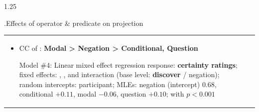 \documentclass[final, table, cmyk]{beamer}
\newlength{\colwidth}
\newlength{\mboxpreadjust}
\begin{document}
\begin{frame}[t]
\begin{columns}[t]
\begin{column}{1.25\colwidth}
\begin{normalbox}{\phantom.\hfill Effects of operator \& predicate on projection}
\begin{tabular}{p{.70\linewidth} p{.3\linewidth}}
\begin{itemize}
					\item CC of \predhighlight{discover}: {\bf \textcolor{modal}{\bf Modal} > \textcolor{neg}{\bf Negation} > \textcolor{cond}{\bf Conditional}, \textcolor{question}{\bf Question}}
						\vspace{\mboxpreadjust}
						\begin{modelbox}{Model \#4: Linear mixed effect regression}
							\footnotesize
							response: \textbf{certainty ratings}; fixed effects: \ophighlight{operator}, \predhighlight{predicate}, and interaction (base level: \textbf{discover} / negation); random intercepts: participant; \newline
							MLEs: negation (intercept) $0.68$, conditional $+0.11$, modal $-0.06$, question $+0.10$; with $p < 0.001$
						\end{modelbox}

				\end{itemize}

					&


\end{tabular}
\end{normalbox}
\end{column}
\end{columns}
\end{frame}
\end{document}
